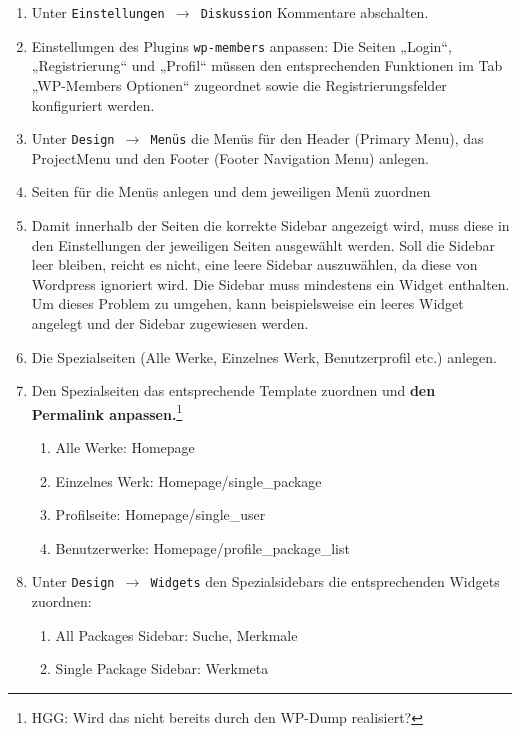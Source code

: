 \documentclass[11pt,a4paper]{article}
\begin{document}
\begin{enumerate}
\item Unter \texttt{Einstellungen\,$\to$\,Diskussion} Kommentare abschalten.
\item Einstellungen des Plugins \texttt{wp-members} anpassen: Die Seiten
  „Login“, „Registrierung“ und „Profil“ müssen den entsprechenden Funktionen
  im Tab „WP-Members Optionen“ zugeordnet sowie die Registrierungsfelder
  konfiguriert werden.
\item Unter \texttt{Design\,$\to$\,Menüs} die Menüs für den Header (Primary
  Menu), das ProjectMenu und den Footer (Footer Navigation Menu) anlegen.
\item Seiten für die Menüs anlegen und dem jeweiligen Menü zuordnen
\item Damit innerhalb der Seiten die korrekte Sidebar angezeigt wird, muss
  diese in den Einstellungen der jeweiligen Seiten ausgewählt werden.  Soll
  die Sidebar leer bleiben, reicht es nicht, eine leere Sidebar auszuwählen,
  da diese von Wordpress ignoriert wird. Die Sidebar muss mindestens ein
  Widget enthalten. Um dieses Problem zu umgehen, kann beispielsweise ein
  leeres Widget angelegt und der Sidebar zugewiesen werden.
\item Die Spezialseiten (Alle Werke, Einzelnes Werk, Benutzerprofil etc.)
  anlegen.
\item Den Spezialseiten das entsprechende Template zuordnen und \textbf{den
  Permalink anpassen.}\footnote{HGG: Wird das nicht bereits durch den WP-Dump
  realisiert?} 

\begin{enumerate}
\item Alle Werke: Homepage
\item Einzelnes Werk: Homepage/single\_package
\item Profilseite: Homepage/single\_user
\item Benutzerwerke: Homepage/profile\_package\_list
\end{enumerate}
\item Unter \texttt{Design\,$\to$\,Widgets} den Spezialsidebars die
  entsprechenden Widgets zuordnen:

\begin{enumerate}
\item All Packages Sidebar: Suche, Merkmale
\item Single Package Sidebar: Werkmeta
\end{enumerate}
\end{enumerate}
\end{document}
